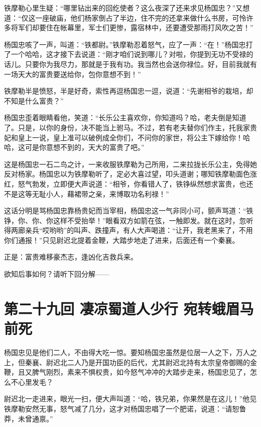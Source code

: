 \documentclass[12pt,oneside]{book}
\begin{document}
铁摩勒心里生疑：``哪里钻出来的回纥使者？这么夜深了还来求见杨国忠？''又想道：``仅这一座破庙，他们杨家倒占了半边，住不完的还拿来做什么书房，可怜许多将军们却要住在帐幕里，军士们更惨，露宿林中，还要遭受那雨打风吹之苦！''

杨国忠咳了一声，叫道：``铁都尉。''铁摩勒忍着怒气，应了一声：``在！''杨国忠打了一个哈哈，这才接下去说道：``刚才咱们说到哪儿？对啦，你提到无功不受禄的话儿。只要你为我尽力，那就是于我有功。我当然也会送你禄位。好，目前我就有一场天大的富贵要送给你，包你意想不到！''

铁摩勒半是愤怒，半是好奇，索性再逗杨国忠一逗，说道：``先谢相爷的栽培，却不知是什么富贵？''

杨国忠歪着眼睛看他，笑道：``长乐公主喜欢你，你知道吗？哈，老夫倒是知道了。只是，以你的身份，决不能当上驸马。不过，若有老夫替你们作主，托我家贵妃和皇上一说，皇上准可以破例成全你们，不问你的家世，将公主下嫁给你！哈哈，这可是你意想不到的，天大的富贵了吧。''

这是杨国忠一石二鸟之计，一来收服铁摩勒为己所用，二来拉拢长乐公主，免得她反对杨家。杨国忠以为铁摩勒听了，定必大喜过望，叩头道谢；哪知铁摩勒面色涨红，怒气勃发，立即便大声说道：``相爷，你看错人了，铁铮纵然想求富贵，也还不是这等无耻小人，藉裙带之亲，来博取功名利禄！''

这话分明是骂杨国忠靠杨贵妃而当宰相，杨国忠这一气非同小可，颤声骂道：``铁铮，你、你、你这样不受抬举！''眼看双方如箭在弦，一触即发。就在这时，忽听得两廊亲兵``哎哟哟''的叫声、跌撞声，有人大声喝道：``让开，我老黑来了，不用你们通报！''只见尉迟北提着金鞭，大踏步地走了进来，后面还有一个秦襄。

正是：富贵难移豪杰志，逢凶化吉救兵来。

欲知后事如何？请听下回分解------

\chapter{第二十九回 凄凉蜀道人少行
宛转蛾眉马前死}\label{ux7b2cux4e8cux5341ux4e5dux56de-ux51c4ux51c9ux8700ux9053ux4ebaux5c11ux884c-ux5b9bux8f6cux86feux7709ux9a6cux524dux6b7b}

杨国忠见是他们二人，不由得大吃一惊。要知杨国忠虽然是位居一人之下，万人之上，但秦襄、尉迟北二人乃是开国功臣的后代，尤其尉迟北持有太宗皇帝御赐的金鞭，且又脾气刚烈，素来不惧权贵，如今怒气冲冲的大踏步走来，杨国忠见了，怎么不心里发毛？

尉迟北一走进来，眼光一扫，便大声叫道：``哈，铁兄弟，你果然是在这儿！''他见铁摩勒安然无事，怒气减了几分，这才对杨国忠唱了一个肥诺，说道：``请恕鲁莽，未曾通禀。''
\end{document}
